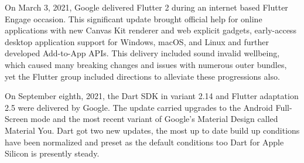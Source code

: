 On March 3, 2021, Google delivered Flutter 2 during an internet based Flutter Engage occasion. This significant update brought official help for online applications with new Canvas Kit renderer and web explicit gadgets, early-access desktop application support for Windows, macOS, and Linux and further developed Add-to-App APIs. This delivery included sound invalid wellbeing, which caused many breaking changes and issues with numerous outer bundles, yet the Flutter group included directions to alleviate these progressions also.

On September eighth, 2021, the Dart SDK in variant 2.14 and Flutter adaptation 2.5 were delivered by Google. The update carried upgrades to the Android Full-Screen mode and the most recent variant of Google's Material Design called Material You. Dart got two new updates, the most up to date build up conditions have been normalized and preset as the default conditions too Dart for Apple Silicon is presently steady.
